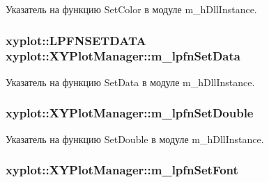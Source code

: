 Указатель на функцию Set\-Color в модуле m\-\_\-h\-Dll\-Instance. 

\hypertarget{group__gr_func_pointers_ga12cbf5f4c39f57265eb98fa148e9150a}{
\subsubsection[{m\-\_\-lpfn\-Set\-Data}]{\setlength{\rightskip}{0pt plus 5cm}xyplot\-::\-L\-P\-F\-N\-S\-E\-T\-D\-A\-T\-A xyplot\-::\-X\-Y\-Plot\-Manager\-::m\-\_\-lpfn\-Set\-Data\hspace{0.3cm}{\ttfamily [protected]}}}\label{group__gr_func_pointers_ga12cbf5f4c39f57265eb98fa148e9150a}


Указатель на функцию Set\-Data в модуле m\-\_\-h\-Dll\-Instance. 

\hypertarget{group__gr_func_pointers_ga1f974cec0445d2921f6e039830b27942}{
\subsubsection[{m\-\_\-lpfn\-Set\-Double}]{ xyplot\-::\-X\-Y\-Plot\-Manager\-::m\-\_\-lpfn\-Set\-Double\hspace{0.3cm}{\ttfamily [protected]}}}\label{group__gr_func_pointers_ga1f974cec0445d2921f6e039830b27942}


Указатель на функцию Set\-Double в модуле m\-\_\-h\-Dll\-Instance. 

\hypertarget{group__gr_func_pointers_ga20972e1ead3d8fc4ae624436c7c562e5}{
\subsubsection[{m\-\_\-lpfn\-Set\-Font}]{ xyplot\-::\-X\-Y\-Plot\-Manager\-::m\-\_\-lpfn\-Set\-Font\hspace{0.3cm}{\ttfamily [protected]}}}\label{group__gr_func_pointers_ga20972e1ead3d8fc4ae624436c7c562e5}


